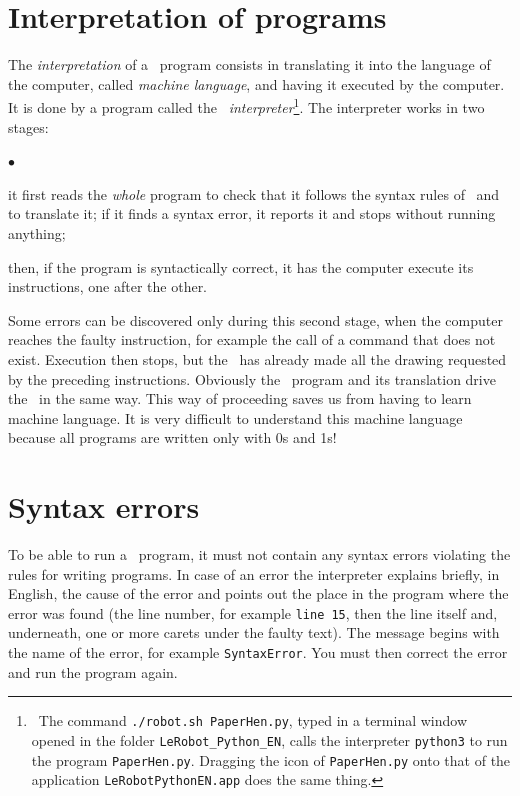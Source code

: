\section{Interpretation of programs}
The {\em interpretation} of a \python\ program consists in translating it
into the language of the com\-pu\-ter,
called {\em machine language}, and having it executed by the computer.
It is done by a program
called the \python\ {\em interpreter}\@\footnote{\ The command
{\tt ./robot.sh PaperHen.py}, typed in a
terminal window opened in the folder {\tt LeRobot\_Python\_EN}, calls the interpreter
{\tt python3} to run the program {\tt PaperHen.py}. Dragging the icon of
{\tt PaperHen.py} onto that of the application {\tt LeRobotPythonEN.app} does the same thing.}.
The interpreter works in two stages:
\begin{list}{$\scriptscriptstyle\bullet$}{
\renewcommand{\rightmargin}{0mm}
}
\item it first reads the {\em whole} program to check that it follows the syntax rules
of \python\ and to translate it; if it finds a syntax error, it reports it
and stops without running anything;
\item then, if the program is syntactically correct, it has the computer execute its
instructions, one after the other.
\end{list}
Some errors can be discovered only during this second stage, when
the com\-pu\-ter reaches the faulty instruction, for example the call of a command that does not
exist. Execution then stops, but the \robot\ has already made all the drawing requested
by the preceding instructions.
Obviously the \python\ program and its translation drive
the \robot\ in the same way. This way of proceeding
saves us from having to learn machine language. It is very difficult
to understand this machine language because all programs are written
only with 0s and \hbox{1s!}

\section{Syntax errors}

To be able to run a \python\ program, it must not contain
any syntax errors violating the rules
for writing programs. In case of an error the interpreter explains
briefly, in English, the cause of the error and points out the place in the program
where the er\-ror was found (the line number, for example {\tt line 15}, then the line
itself and, underneath, one or more
carets {\idt {}} under the faulty text). The message begins with
the name of the error, for example {\tt SyntaxError}. You must then
correct the error and run the program again.

